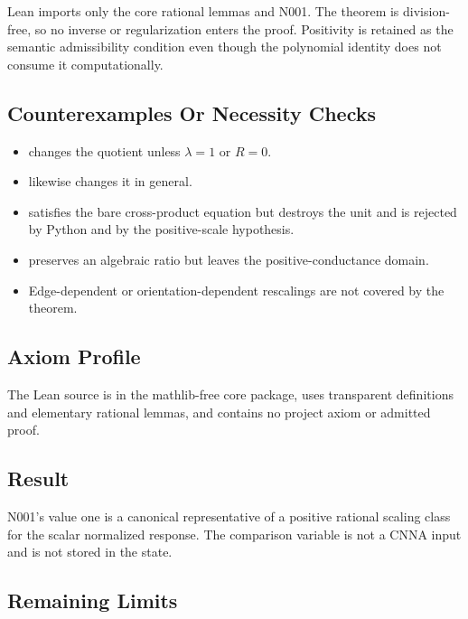 Lean imports only the core rational lemmas and N001. The theorem is
division-free, so no inverse or regularization enters the proof.
Positivity is retained as the semantic admissibility condition even
though the polynomial identity does not consume it computationally.

\subsection{Counterexamples Or Necessity
Checks}\label{counterexamples-or-necessity-checks-3}

\begin{itemize}
\tightlist
\item
  \texttt{\protect{}} changes the quotient
  unless \(\lambda=1\) or \(R=0\).
\item
  \texttt{\protect{}} likewise changes it in
  general.
\item
  \texttt{\protect{}} satisfies the bare cross-product equation but
  destroys the unit and is rejected by Python and by the positive-scale
  hypothesis.
\item
  \texttt{\protect{}} preserves an algebraic ratio but leaves
  the positive-conductance domain.
\item
  Edge-dependent or orientation-dependent rescalings are not covered by
  the theorem.
\end{itemize}

\subsection{Axiom Profile}\label{axiom-profile-3}

The Lean source is in the mathlib-free core package, uses transparent
\texttt{\protect{}} definitions and elementary rational lemmas, and contains no
project axiom or admitted proof.

\subsection{Result}\label{result-12}

N001's value one is a canonical representative of a positive rational
scaling class for the scalar normalized response. The comparison
variable is not a CNNA input and is not stored in the state.

\subsection{Remaining Limits}\label{remaining-limits-3}

